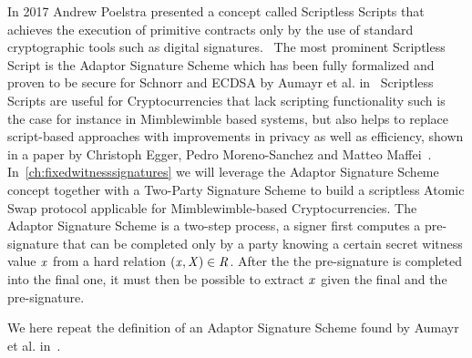 In 2017 Andrew Poelstra presented a concept called Scriptless Scripts that achieves the execution of primitive contracts only by the use of standard cryptographic tools such as digital signatures.~\cite{poelstra2017scriptless}
The most prominent Scriptless Script is the Adaptor Signature Scheme which has been fully formalized and proven to be secure for Schnorr and ECDSA by Aumayr et al. in~\cite{aumayr2020bitcoinchannels}
Scriptless Scripts are useful for Cryptocurrencies that lack scripting functionality such is the case for instance in Mimblewimble based systems, but also helps to replace script-based approaches with improvements in privacy as well as efficiency, shown in a paper by Christoph Egger, Pedro Moreno-Sanchez and Matteo Maffei~\cite{egger2019atomic}.
In~\cref{ch:fixedwitnesssignatures} we will leverage the Adaptor Signature Scheme concept together with a Two-Party Signature Scheme to build a scriptless Atomic Swap protocol applicable for Mimblewimble-based Cryptocurrencies.
The Adaptor Signature Scheme is a two-step process, a signer first computes a pre-signature that can be completed only by a party knowing a certain secret witness value $\mathit{x}$ from a hard relation $(\mathit{x}, \mathit{X}) \in \mathit{R}$.
After the the pre-signature is completed into the final one, it must then be possible to extract $\mathit{x}$ given the final and the pre-signature.

We here repeat the definition of an Adaptor Signature Scheme found by Aumayr et al. in~\cite{aumayr2020bitcoinchannels}.

